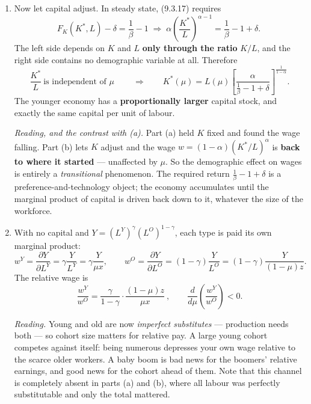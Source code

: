 \documentclass[12pt, letterpaper]{article}
\newcommand{\pd}[2]{\dfrac{\partial #1}{\partial #2}}
\newcommand{\dd}[2]{\dfrac{d #1}{d #2}}
\newcommand{\stst}{^{\ast}}
\begin{document}
\begin{tcolorbox}[oddbox,title={Problem 9.7 \quad Getting Old}]
\begin{enumerate}
\item Now let capital adjust. In steady state, (9.3.17) requires
\[
F_K(K\stst,L)-\delta=\frac{1}{\beta}-1
\;\Longrightarrow\;
\alpha\left(\frac{K\stst}{L}\right)^{\alpha-1}=\frac{1}{\beta}-1+\delta .
\]
The left side depends on $K$ and $L$ \textbf{only through the ratio} $K/L$, and the right
side contains no demographic variable at all. Therefore
\[
\boxed{\ \frac{K\stst}{L}\ \text{is independent of }\mu\ }
\qquad\Longrightarrow\qquad
K\stst(\mu)=L(\mu)\left[\frac{\alpha}{\frac{1}{\beta}-1+\delta}\right]^{\frac{1}{1-\alpha}} .
\]
The younger economy has a \textbf{proportionally larger} capital stock, and exactly the same
capital per unit of labour.

\smallskip
\emph{Reading, and the contrast with (a).} Part (a) held $K$ fixed and found the wage
falling. Part (b) lets $K$ adjust and the wage
$w=(1-\alpha)(K\stst/L)^{\alpha}$ is \textbf{back to where it started} --- unaffected by
$\mu$. So the demographic effect on wages is entirely a \emph{transitional} phenomenon. The
required return $\frac{1}{\beta}-1+\delta$ is a preference-and-technology object; the economy
accumulates until the marginal product of capital is driven back down to it, whatever the
size of the workforce.

\item With no capital and $Y=(L^Y)^\gamma(L^O)^{1-\gamma}$, each type is paid its own
marginal product:
\[
w^Y=\pd{Y}{L^Y}=\gamma\frac{Y}{L^Y}=\gamma\frac{Y}{\mu x},
\qquad
w^O=\pd{Y}{L^O}=(1-\gamma)\frac{Y}{L^O}=(1-\gamma)\frac{Y}{(1-\mu)z}.
\]
The relative wage is
\[
\boxed{\ \frac{w^Y}{w^O}=\frac{\gamma}{1-\gamma}\cdot\frac{(1-\mu)z}{\mu x}\ },
\qquad
\dd{}{\mu}\left(\frac{w^Y}{w^O}\right)<0 .
\]

\emph{Reading.} Young and old are now \emph{imperfect substitutes} --- production needs both
--- so cohort size matters for relative pay. A large young cohort competes against itself:
being numerous depresses your own wage relative to the scarce older workers. A baby boom is
bad news for the boomers' relative earnings, and good news for the cohort ahead of them.
Note that this channel is completely absent in parts (a) and (b), where all labour was
perfectly substitutable and only the total mattered.
\end{enumerate}
\end{tcolorbox}
\end{document}
